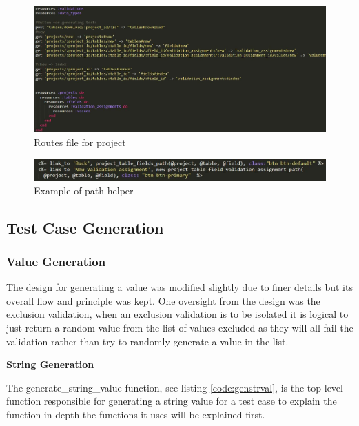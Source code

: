 \documentclass[a4paper,12pt]{article}
\begin{document}
\begin{figure}
\includegraphics[width=\linewidth]{screenshots/routes}
\caption{Routes file for project}
\label{fig:routes}
\end{figure}

\begin{figure}
\includegraphics[width=\linewidth]{screenshots/root}
\caption{Example of path helper}
\label{fig:pathhelp}
\end{figure}

\subsection{Test Case Generation}


\subsubsection{Value Generation}

\par The design for generating a value was modified slightly due to finer details but its overall flow and principle was kept. One oversight from the design was the exclusion validation, when an exclusion validation is to be isolated it is logical to just return a random value from the list of values excluded as they will all fail the validation rather than try to randomly generate a value in the list.
\vspace{3mm}
\par \textbf{String Generation}

\par The generate\_string\_value function, see listing \ref{code:genstrval}, is the top level function responsible for generating a string value for a test case to explain the function in depth the functions it uses will be explained first.
\end{document}

